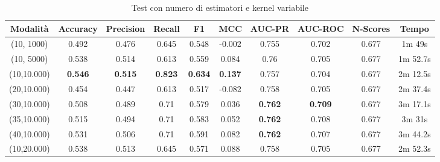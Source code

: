 \begin{table}[h!]
    \centering
    \begin{adjustbox}{max width=\textwidth}
    \begin{tabular}{|c|c|c|c|c|c|c|c|c|c|}
    \hline
         \textbf{Modalità} & \textbf{Accuracy} &\textbf{Precision}  & \textbf{Recall} & \textbf{F1} & \textbf{MCC} & \textbf{AUC-PR} & \textbf{AUC-ROC} & \textbf{N-Scores}&\textbf{Tempo}\\
        \hline
        (10, 1000) &0.492& 0.476& 0.645& 0.548&-0.002& 0.755 &0.702 & 0.677 & 1m 49s \\
         \hline
         (10, 5000) &0.538& 0.514& 0.613& 0.559&0.084& 0.76 &0.705 & 0.677&1m 52.7s\\
         \hline
        (10,10.000)&\textbf{0.546} &\textbf{0.515} &\textbf{0.823} &\textbf{0.634} & \textbf{0.137}& 0.757& 0.704&0.677& 2m 12.5s\\
         \hline
         (20,10.000)&0.454 &0.447 &0.613 &0.517 &-0.082 &0.758 &0.705& 0.677&2m 37.4s\\
         \hline
         (30,10.000)&0.508 &0.489 &0.71 &0.579 &0.036 &\textbf{0.762} &\textbf{0.709}& 0.677& 3m 17.1s\\
         \hline
         (35,10.000)&0.515 &0.494 &0.71 &0.583 & 0.052 &\textbf{0.762} &0.708& 0.677&3m 31s\\
         \hline
         (40,10.000)&0.531 &0.506 &0.71 &0.591 &0.082 &\textbf{0.762} &0.707& 0.677&3m 44.2s\\
         \hline
         (10,20.000)&0.538 &0.513 &0.645 &0.571 &0.088 &0.758 &0.705& 0.677&2m 52.3s\\
         \hline
    \end{tabular}
    \end{adjustbox}
    \caption{Test con numero di estimatori e kernel variabile}
    \label{tab:ROCKAD_OPS-SAT}
\end{table}

